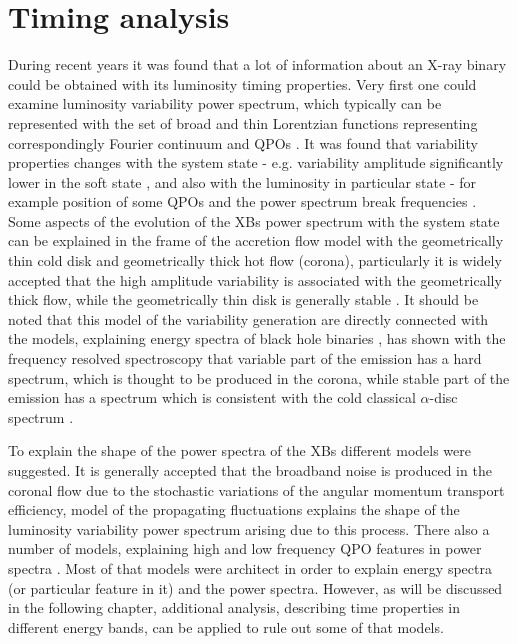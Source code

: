 \section{Timing analysis} 

During recent years it was found that a lot of information about an X-ray binary could be obtained with its luminosity timing properties.
Very first one could examine luminosity variability power spectrum, which typically can be represented with the set of broad and thin Lorentzian functions representing correspondingly Fourier continuum and QPOs \citep[see, e.g.][]{1972ApJ...174L..35T, 1990A&A...227L..33B}.
It was found that variability properties changes with the system state - e.g. variability amplitude significantly lower in the soft state \citep{},  and also with the luminosity in particular state - for example position of some QPOs and the power spectrum break frequencies \cite{1990A&A...227L..33B}. 
Some aspects of the evolution of the XBs power spectrum with the system state can be explained in the frame of the accretion flow model with the geometrically thin cold disk and geometrically thick hot flow (corona), particularly it is widely accepted that the high amplitude variability is associated with the geometrically thick flow, while the geometrically thin disk is generally stable \citep{churazov}. 
It should be noted that this model of the variability generation are directly connected with the models, explaining energy spectra of black hole binaries \citep[see, e.g.,][]{1975ApJ...199L.153E, 1976ApJ...204..187S, 1995ApJ...452..710N}, \citet{churazov} has shown with the frequency resolved spectroscopy that variable part of the emission has a hard spectrum, which is thought to be produced in the corona, while stable part of the emission has a spectrum which is consistent with the cold classical $\alpha$-disc spectrum \citep{ss73}.

To explain the shape of the power spectra of the XBs different models were suggested. 
It is generally accepted that the broadband noise is produced in the coronal flow due to the stochastic variations of the angular momentum transport efficiency, \citep{lyubarskii97} model of the propagating fluctuations explains the shape of the luminosity variability power spectrum arising due to this process. 
There also a number of models, explaining high and low frequency QPO features in power spectra \citep[][]{ingram09, citesomething}. 
Most of that models were architect in order to explain energy spectra (or particular feature in it) and the power spectra. 
However, as will be discussed in the following chapter, additional analysis, describing time properties in different energy bands, can be applied to rule out some of that models.

